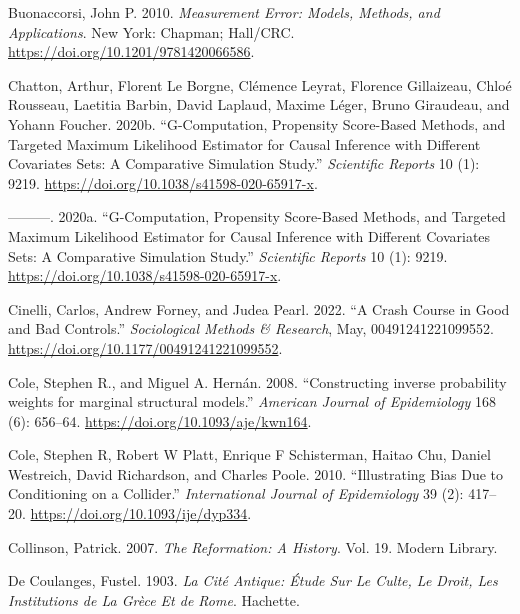 \documentclass[
  singlecolumn]{report}
\newlength{\cslhangindent}
\newlength{\cslentryspacingunit} %
\newenvironment{CSLReferences}[2] %
 {%
  \setlength{\parindent}{0pt}
  \ifodd #1
  \let\oldpar\par
  \def\par{\hangindent=\cslhangindent\oldpar}
  \fi
  \setlength{\parskip}{#2\cslentryspacingunit}
 }%
 {}
\begin{document}
\begin{CSLReferences}{1}{0}
\leavevmode{}%
Buonaccorsi, John P. 2010. \emph{Measurement Error: Models, Methods, and
Applications}. New York: Chapman; Hall/CRC.
\url{https://doi.org/10.1201/9781420066586}.

\leavevmode{}%
Chatton, Arthur, Florent Le Borgne, Clémence Leyrat, Florence
Gillaizeau, Chloé Rousseau, Laetitia Barbin, David Laplaud, Maxime
Léger, Bruno Giraudeau, and Yohann Foucher. 2020b. {``G-Computation,
Propensity Score-Based Methods, and Targeted Maximum Likelihood
Estimator for Causal Inference with Different Covariates Sets: A
Comparative Simulation Study.''} \emph{Scientific Reports} 10 (1): 9219.
\url{https://doi.org/10.1038/s41598-020-65917-x}.

\leavevmode{}%
---------. 2020a. {``G-Computation, Propensity Score-Based Methods, and
Targeted Maximum Likelihood Estimator for Causal Inference with
Different Covariates Sets: A Comparative Simulation Study.''}
\emph{Scientific Reports} 10 (1): 9219.
\url{https://doi.org/10.1038/s41598-020-65917-x}.

\leavevmode{}%
Cinelli, Carlos, Andrew Forney, and Judea Pearl. 2022. {``A Crash Course
in Good and Bad Controls.''} \emph{Sociological Methods \& Research},
May, 00491241221099552. \url{https://doi.org/10.1177/00491241221099552}.

\leavevmode{}%
Cole, Stephen R., and Miguel A. Hernán. 2008. {``Constructing inverse
probability weights for marginal structural models.''} \emph{American
Journal of Epidemiology} 168 (6): 656--64.
\url{https://doi.org/10.1093/aje/kwn164}.

\leavevmode{}%
Cole, Stephen R, Robert W Platt, Enrique F Schisterman, Haitao Chu,
Daniel Westreich, David Richardson, and Charles Poole. 2010.
{``Illustrating Bias Due to Conditioning on a Collider.''}
\emph{International Journal of Epidemiology} 39 (2): 417--20.
\url{https://doi.org/10.1093/ije/dyp334}.

\leavevmode{}%
Collinson, Patrick. 2007. \emph{The Reformation: A History}. Vol. 19.
Modern Library.

\leavevmode{}%
De Coulanges, Fustel. 1903. \emph{La Cité Antique: Étude Sur Le Culte,
Le Droit, Les Institutions de La Grèce Et de Rome}. Hachette.


\end{CSLReferences}
\end{document}
